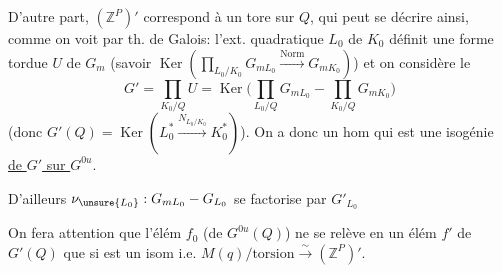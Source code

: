D'autre part, $(\mathbb Z^P)'$ correspond à un tore sur $Q$, qui peut se décrire ainsi, comme on voit par th. de Galois: l'ext. quadratique $L_0$ de $K_0$ définit une forme tordue $U$ de $G_m$ (savoir $\operatorname{Ker}(\prod_{L_0/K_0}G_{mL_0}\xrightarrow{\text{Norm}}G_{mK_0})$) et on considère le
\[
G'=\prod_{K_0/Q}U=\operatorname{Ker}\bigl(\prod_{L_0/Q}G_{mL_0}\mathbin{-}\prod_{K_0/Q}G_{mK_0}\bigr)
\]
(donc $G'(Q)=\operatorname{Ker}(L_0^*\xrightarrow{N_{L_0/K_0}}K_0^*)$). On a donc un hom
qui est une isogénie \uline{de $G'$ sur $G^{0u}$}.

D'ailleurs $\nu_{\unsure{L_0}}:G_{mL_0}\mathbin{-}G_{L_0}$ se factorise par $G'_{L_0}$

On fera attention que l'élém $f_0$  (de $G^{0u}(Q)$) ne se relève en un élém  $f'$ de $G'(Q)$ que si \inserted{$\varphi$} est un isom i.e. $M(q)/\text{torsion}\xrightarrow{\sim}(\mathbb Z^P)'$.

